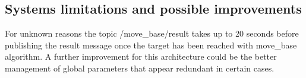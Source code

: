 \subsection*{System\textquotesingle{}s limitations and possible improvements}

For unknown reasons the topic /move\+\_\+base/result takes up to 20 seconds before publishing the result message once the target has been reached with move\+\_\+base algorithm. A further improvement for this architecture could be the better management of global parameters that appear redundant in certain cases. 